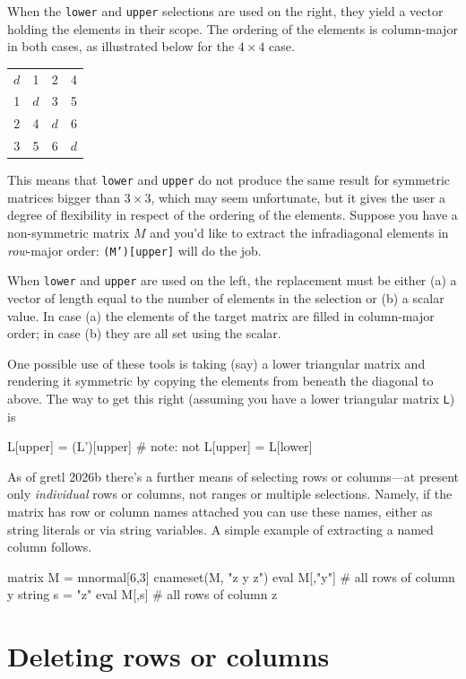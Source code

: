 When the \texttt{lower} and \texttt{upper} selections are used on the
right, they yield a vector holding the elements in their scope. The
ordering of the elements is column-major in both cases, as illustrated
below for the $4 \times 4$ case.
\begin{center}
  \begin{tabular}{cccc}
    $d$ & 1 & 2 & 4 \\
    1 & $d$ & 3 & 5 \\
    2 & 4 & $d$ & 6 \\
    3 & 5 & 6 & $d$
  \end{tabular}
\end{center}
This means that \texttt{lower} and \texttt{upper} do not produce the
same result for symmetric matrices bigger than $3 \times 3$, which may
seem unfortunate, but it gives the user a degree of flexibility in
respect of the ordering of the elements. Suppose you have a
non-symmetric matrix $M$ and you'd like to extract the infradiagonal
elements in \textit{row}-major order: \texttt{(M')[upper]} will do the
job.

When \texttt{lower} and \texttt{upper} are used on the left, the
replacement must be either (a) a vector of length equal to the number
of elements in the selection or (b) a scalar value. In case (a) the
elements of the target matrix are filled in column-major order; in
case (b) they are all set using the scalar.

One possible use of these tools is taking (say) a lower triangular
matrix and rendering it symmetric by copying the elements from beneath
the diagonal to above. The way to get this right (assuming you have a
lower triangular matrix \texttt{L}) is
\begin{code}
L[upper] = (L')[upper]  # note: not L[upper] = L[lower]
\end{code}

As of gretl 2026b there's a further means of selecting rows or
columns---at present only \textit{individual} rows or columns, not
ranges or multiple selections. Namely, if the matrix has row or column
names attached you can use these names, either as string literals or
via string variables. A simple example of extracting a named column
follows.
\begin{code}
matrix M = mnormal[6,3]
cnameset(M, "z y z")
eval M[,"y"] # all rows of column y
string s = "z"
eval M[,s]   # all rows of column z
\end{code}

\section{Deleting rows or columns}
\label{sec:neg-indices}

